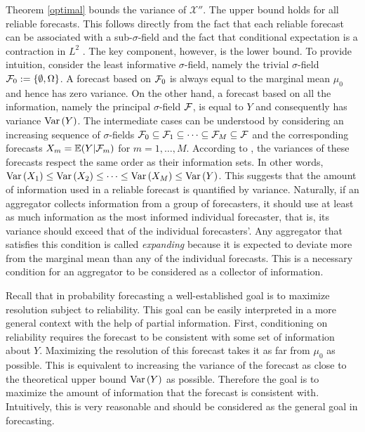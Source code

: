 \documentclass[11pt]{article}
\newcommand{\E}{\mathbb{E}}
\theoremstyle{definition}
\theoremstyle{definition}
\def\F{{\cal F}}
\def\E{{\mathbb E}}
\def\Var{{\rm Var}\,}
\begin{document}
Theorem \ref{optimal} bounds the variance of $\mathcal{X}''$. The upper bound holds for all reliable forecasts. This follows directly from the fact that each reliable forecast can be associated with a sub-$\sigma$-field and the fact that conditional expectation is a contraction in $L^2$ \citep[Theorem 5.1.4.]{durrett2010probability}. The key component, however, is the lower bound.
To provide intuition, consider the least informative $\sigma$-field, namely the trivial $\sigma$-field $\F_0 := \{\emptyset, \Omega\}$. A forecast based on $\F_0$ is always equal to the marginal mean $\mu_0$ and hence has zero variance. On the other hand, a forecast based on all the information, namely the principal $\sigma$-field $\F$, is equal to $Y$ and consequently has variance $\Var(Y)$. 
The intermediate cases can be understood by considering an increasing sequence of $\sigma$-fields $\F_0 \subseteq \F_1 \subseteq \dots \subseteq \F_M \subseteq \F$ and the corresponding forecasts $X_m = \E(Y|\F_m)$ for $m = 1, \dots, M$. According to \citet[Proposition 2.1]{satopaamodeling2}, the variances of these forecasts respect the same order as their information sets. In other words, $\Var(X_1) \leq \Var(X_2) \leq \dots \leq \Var(X_M) \leq \Var(Y)$. This suggests that the amount of information used in a reliable forecast is quantified by variance. Naturally, if an aggregator collects information from a group of forecasters, it should use at least as much information as the most informed individual forecaster, that is, its variance should exceed that of the individual forecasters'. Any aggregator that satisfies this condition is called \textit{expanding} because it is expected to deviate more from the marginal mean than any of the individual forecasts. This is a necessary condition for an aggregator to be considered as a collector of information. 


Recall that in probability forecasting a well-established goal is to maximize resolution subject to reliability. This goal can be easily interpreted in a more general context with the help of partial information. First, conditioning on reliability requires the forecast to be consistent with some set of information about $Y$. Maximizing the resolution of this forecast takes it as far from $\mu_0$ as possible. This is equivalent to increasing the variance of the forecast as close to the theoretical upper bound $\Var(Y)$ as possible. Therefore the goal is to maximize the amount of information that the forecast is consistent with. Intuitively, this is very reasonable and should be considered as the general goal in forecasting.
\end{document}
